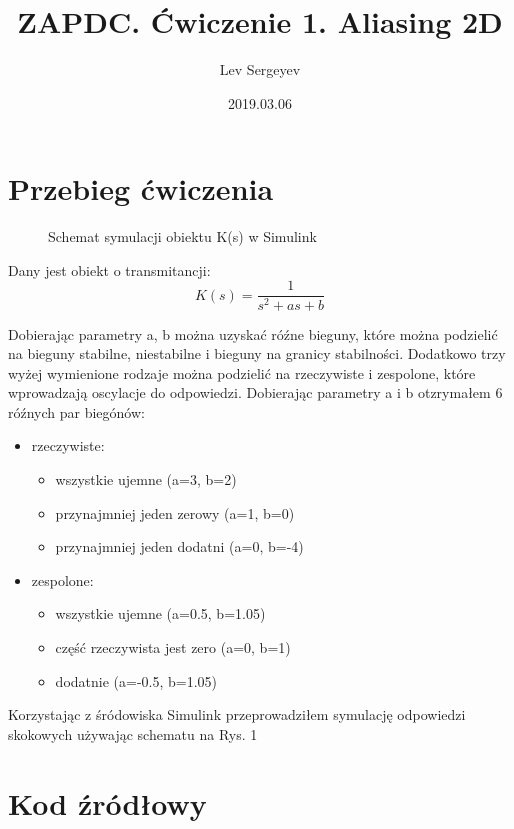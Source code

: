 \documentclass{article}
\author{Lev Sergeyev}
\title{ZAPDC. Ćwiczenie 1. Aliasing 2D}
\date{2019.03.06}
\begin{document}
\maketitle


\section{Przebieg ćwiczenia}


\begin{figure}[h]
\centering
\caption{Schemat symulacji obiektu K(s) w Simulink}
\end{figure}


\par
Dany jest obiekt o transmitancji:
\begin{equation}
K(s)=\frac{1}{s^2+as+b} 
\end{equation}
\par
Dobierając parametry a, b można uzyskać róźne bieguny, które można podzielić na bieguny stabilne,  niestabilne i bieguny na granicy stabilności. Dodatkowo trzy wyżej wymienione rodzaje można podzielić na rzeczywiste i zespolone, które wprowadzają oscylacje do odpowiedzi.
Dobierając parametry a i b otzrymałem 6 róźnych par biegónów: 
\begin{itemize}  
	\item rzeczywiste:
	\begin{itemize}  
		\item wszystkie ujemne (a=3, b=2)
		\item przynajmniej jeden zerowy (a=1, b=0)
		\item przynajmniej jeden dodatni (a=0, b=-4)
	\end{itemize}
	\item zespolone:
	\begin{itemize}  
		\item wszystkie ujemne (a=0.5, b=1.05)
		\item część rzeczywista jest zero (a=0, b=1)
		\item dodatnie (a=-0.5, b=1.05)
	\end{itemize}
\end{itemize}
Korzystając z śródowiska Simulink przeprowadziłem symulację odpowiedzi skokowych używając schematu na Rys. 1



\pagebreak
\section{Kod źródłowy}
\end{document}
